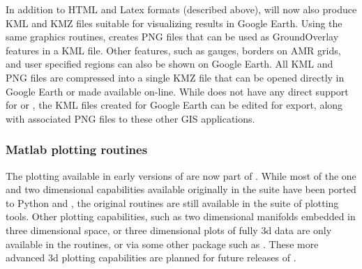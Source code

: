 In addition to HTML and Latex formats (described above), \vclaw will now also
produce KML and KMZ files suitable for visualizing results in Google Earth.
Using the same \mplotlib graphics routines, \vclaw creates PNG files
that can be used as GroundOverlay features in a KML file.  Other features, such
as gauges, borders on AMR grids, and user specified regions can also be
shown on Google Earth.  All KML and PNG files are compressed into a single
KMZ file  that can be opened directly in Google Earth or made available on-line.
While \vclaw does not have any direct support for \agis or \qgis,
the  KML files created for Google Earth can be edited for
export, along with associated PNG files to these other GIS applications.

\subsubsection{Matlab plotting routines}
The \mlab plotting available in early versions of \cpack are now part
of \vclaw.  While most of the one and two dimensional capabilities
available originally in the \mlab suite have been ported to Python and
\mplotlib, the original \mlab routines are still available in the \mlab suite of
plotting tools.  Other plotting capabilities, such as two dimensional
manifolds embedded in three dimensional space, or three dimensional
plots of fully 3d data are only available in the \mlab routines, or
via some other package such as \visit \cite{HPV:VisIt}.  These more advanced
3d plotting capabilities are planned for future releases of \vclaw.
